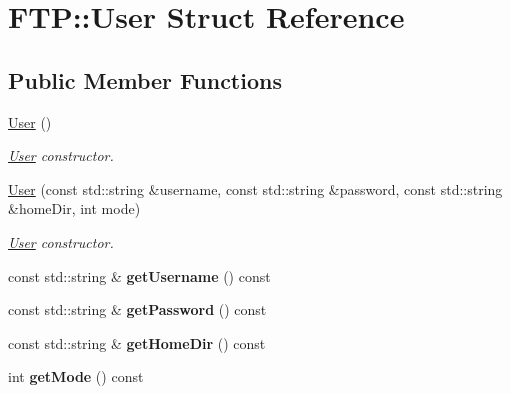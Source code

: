 \hypertarget{struct_f_t_p_1_1_user}{\section{F\-T\-P\-:\-:User Struct Reference}
\label{struct_f_t_p_1_1_user}
}
\subsection*{Public Member Functions}
\begin{DoxyCompactItemize}
\item 
\hypertarget{struct_f_t_p_1_1_user_a1c8caf1199845f651ed9c2e259425af7}{\hyperlink{struct_f_t_p_1_1_user_a1c8caf1199845f651ed9c2e259425af7}{User} ()}\label{struct_f_t_p_1_1_user_a1c8caf1199845f651ed9c2e259425af7}

\begin{DoxyCompactList}\small\item\em \hyperlink{struct_f_t_p_1_1_user}{User} constructor. \end{DoxyCompactList}\item 
\hyperlink{struct_f_t_p_1_1_user_a9935dc6d5520daa68c4c03109723c9f2}{User} (const std\-::string \&username, const std\-::string \&password, const std\-::string \&home\-Dir, int mode)
\begin{DoxyCompactList}\small\item\em \hyperlink{struct_f_t_p_1_1_user}{User} constructor. \end{DoxyCompactList}\item 
\hypertarget{struct_f_t_p_1_1_user_a2de8d6c570a2b686eb751988a61fa80a}{const std\-::string \& {\bfseries get\-Username} () const }\label{struct_f_t_p_1_1_user_a2de8d6c570a2b686eb751988a61fa80a}

\item 
\hypertarget{struct_f_t_p_1_1_user_ae160530513b0c797a0c8c73ce3ad7349}{const std\-::string \& {\bfseries get\-Password} () const }\label{struct_f_t_p_1_1_user_ae160530513b0c797a0c8c73ce3ad7349}

\item 
\hypertarget{struct_f_t_p_1_1_user_a01a8869fd116660896b5fe91233719b1}{const std\-::string \& {\bfseries get\-Home\-Dir} () const }\label{struct_f_t_p_1_1_user_a01a8869fd116660896b5fe91233719b1}

\item 
\hypertarget{struct_f_t_p_1_1_user_abc8ec6b66316c4635d3afa42253826bc}{int {\bfseries get\-Mode} () const }\label{struct_f_t_p_1_1_user_abc8ec6b66316c4635d3afa42253826bc}

\end{DoxyCompactItemize}
